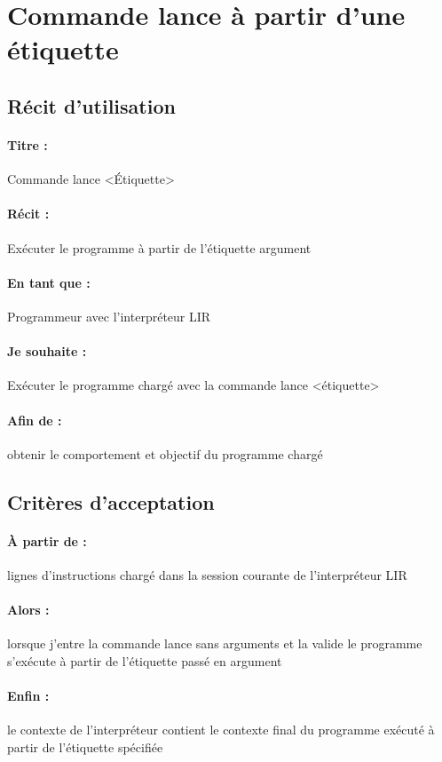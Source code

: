 \section{Commande lance à partir d'une étiquette}

    \subsection*{Récit d'utilisation}

    \paragraph{Titre : } Commande lance <Étiquette>
    \paragraph{Récit : } Exécuter le programme à partir de l'étiquette argument
    \paragraph{En tant que : } Programmeur avec l'interpréteur LIR
    \paragraph{Je souhaite : } Exécuter le programme chargé avec la commande lance <étiquette>
    \paragraph{Afin de : } obtenir le comportement et objectif du programme chargé


    \subsection*{Critères d'acceptation}

    \paragraph{À partir de : } lignes d'instructions chargé dans la session courante de l'interpréteur LIR
    \paragraph{Alors : } lorsque j'entre la commande lance sans arguments et la valide le programme s'exécute à
                         partir de l'étiquette passé en argument
    \paragraph{Enfin : } le contexte de l'interpréteur contient le contexte final du programme exécuté à partir de l'étiquette spécifiée